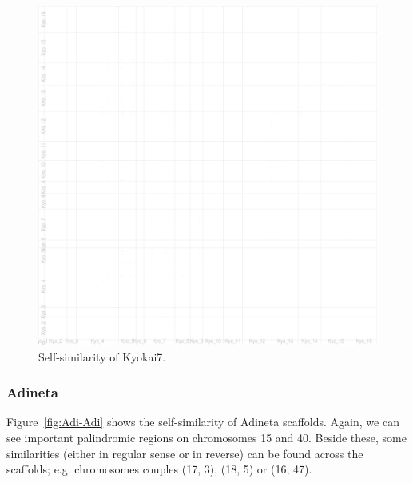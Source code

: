 \documentclass{article}
\begin{document}
\begin{figure}
	\hspace{-1cm}
	\includegraphics[width=1.1\textwidth]{figs/Kyokai7_Kyokai7.eps}
	\caption{Self-similarity of Kyokai7.\label{fig:Kyo-Kyo}}
\end{figure}

\subsubsection{Adineta}

Figure~\ref{fig:Adi-Adi} shows the self-similarity of Adineta scaffolds. Again, we can see important palindromic
regions on chromosomes 15 and 40. Beside these, some similarities (either in regular sense or in reverse) can
be found across the scaffolds; e.g. chromosomes couples (17, 3), (18, 5) or (16, 47).
\end{document}
